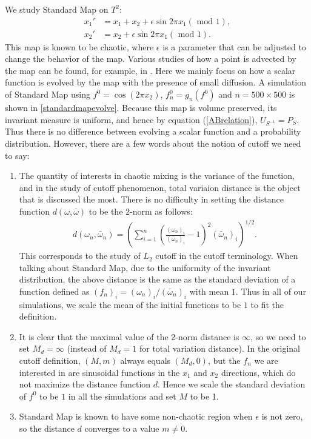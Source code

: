 We study Standard Map on $T^2$:
   \begin{align}
   \label{Standardmap}
               x_1' &= x_1+x_2 +\epsilon \sin{2 \pi x_1}  (\mbox{ mod } 1), \nonumber\\
               x_2' &=  x_2 +\epsilon \sin{2 \pi x_1}     (\mbox{ mod } 1).
   \end{align}
This map is known to be chaotic, where $\epsilon$ is a parameter that can be adjusted to change the
behavior of the map. Various studies of how a point is advected by the map can be found,
for example, in \cite{Ott2002}. Here we mainly focus on how a
scalar function is evolved by the map with the presence of small diffusion. A simulation of Standard Map using $f^0=\cos(2\pi x_2)$, $f_n^0=g_n(f^0)$ and $n=500\times 500$ is shown in \ref{standardmapevolve}. Because this map is
volume preserved, its invariant measure is uniform, and hence by equation
(\ref{ABrelation}), $U_{S^{-1}}=P_S$. Thus there is no difference between evolving a scalar function and a
probability distribution. However, there are a few words about the notion of cutoff we need to say:
\begin{enumerate}
\item The quantity of interests in chaotic mixing is the variance of the function, and in the study of cutoff phenomenon, total variaion distance is the object that is discussed the most. There is no difficulty in setting the distance function $d(\omega,\bar{\omega})$ to be the $2$-norm as follows:
  \begin{eqnarray}
    d(\omega_n,\bar{\omega}_n) = \left(\sum_{i=1}^{n} \left( \frac{(\omega_n)_i}{(\bar{\omega}_n)_i}-1 \right)^2(\bar{\omega}_n)_i \right)^{1/2}.
  \end{eqnarray}
This corresponds to the study of $L_2$ cutoff in the cutoff terminology. When talking about Standard Map, due to the uniformity of the invariant distribution, the above distance is the same as the standard deviation of a function defined as $(f_n)_i = (\omega_n)_i/(\bar{\omega}_n)_i$ with mean $1$. Thus in all of our simulations, we scale the mean of the initial functions to be $1$ to fit the definition. 
\item It is clear that the maximal value of the 2-norm distance is $\infty$, so we need to set $M_d=\infty$ (instead of $M_d=1$ for total variation distance). In the original cutoff definition, $(M,m)$ always equals $(M_d,0)$, but the $f_n$ we are interested in are sinusoidal functions in the $x_1$ and $x_2$ directions, which do not maximize the distance function $d$. Hence we scale the standard deviation of $f^0$ to be $1$ in all the simulations and set $M$ to be 1.

\item Standard Map is known to have some non-chaotic region when $\epsilon$ is not zero, so the distance $d$ converges to a value $m \neq 0$.
\end{enumerate}

